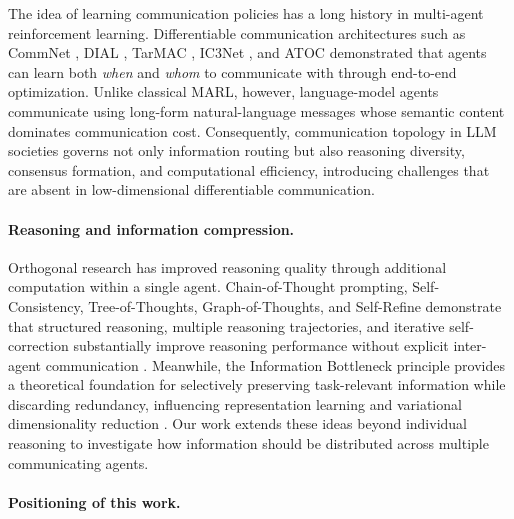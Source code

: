 \documentclass[11pt]{article}
\begin{document}
The idea of learning communication policies has a long history in multi-agent reinforcement learning. Differentiable communication architectures such as CommNet \citep{sukhbaatar2016learningmultiagentcommunicationbackpropagation}, DIAL \citep{foerster2016learning}, TarMAC \citep{das2019tarmac}, IC3Net \citep{singh2018individualized}, and ATOC \citep{jiang2018learningattentionalcommunicationmultiagent} demonstrated that agents can learn both \emph{when} and \emph{whom} to communicate with through end-to-end optimization. Unlike classical MARL, however, language-model agents communicate using long-form natural-language messages whose semantic content dominates communication cost. Consequently, communication topology in LLM societies governs not only information routing but also reasoning diversity, consensus formation, and computational efficiency, introducing challenges that are absent in low-dimensional differentiable communication.

\paragraph{Reasoning and information compression.}

Orthogonal research has improved reasoning quality through additional computation within a single agent. Chain-of-Thought prompting, Self-Consistency, Tree-of-Thoughts, Graph-of-Thoughts, and Self-Refine demonstrate that structured reasoning, multiple reasoning trajectories, and iterative self-correction substantially improve reasoning performance without explicit inter-agent communication \citep{wei2022chain,wang2023selfconsistencyimproveschainthought,yao2023tree,10.1609/aaai.v38i16.29720,madaan2023selfrefine}. Meanwhile, the Information Bottleneck principle provides a theoretical foundation for selectively preserving task-relevant information while discarding redundancy, influencing representation learning and variational dimensionality reduction \citep{7133169,abdelaleem2025deep}. Our work extends these ideas beyond individual reasoning to investigate how information should be distributed across multiple communicating agents.

\paragraph{Positioning of this work.}
\end{document}
